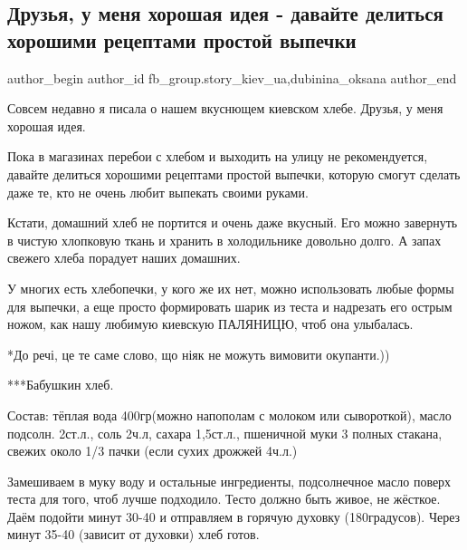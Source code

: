  
 
 
 
 
 
\subsection{Друзья, у меня хорошая идея - давайте делиться хорошими рецептами простой выпечки}
\label{sec:28_02_2022.fb.fb_group.story_kiev_ua.2.vypechka}
 
\ifcmt
 author_begin
   author_id fb_group.story_kiev_ua,dubinina_oksana
 author_end
\fi

Совсем недавно я писала о нашем вкуснющем киевском хлебе. Друзья, у меня
хорошая идея. 

Пока в магазинах перебои с хлебом и выходить на улицу не рекомендуется, давайте
делиться хорошими рецептами простой выпечки, которую смогут сделать даже те,
кто не очень любит выпекать своими руками. 

Кстати, домашний хлеб не портится и очень даже вкусный. Его можно завернуть в
чистую хлопковую ткань и хранить в холодильнике довольно долго. А запах свежего
хлеба порадует наших домашних. 


У многих есть хлебопечки, у кого же их нет, можно использовать любые формы для
выпечки, а еще просто формировать шарик из теста и надрезать его острым ножом,
как нашу любимую киевскую ПАЛЯНИЦЮ, чтоб она улыбалась.

*До речі, це те саме слово, що ніяк не можуть вимовити окупанти.))

***Бабушкин хлеб.

Состав: тёплая вода 400гр(можно напополам с молоком или сывороткой), масло
подсолн. 2ст.л., соль 2ч.л, сахара 1,5ст.л., пшеничной муки 3 полных стакана,
свежих около 1/3 пачки (если сухих дрожжей 4ч.л.)

Замешиваем в муку воду и остальные ингредиенты, подсолнечное масло поверх теста
для того, чтоб лучше подходило. Тесто должно быть живое, не жёсткое. Даём
подойти минут 30-40 и отправляем в горячую духовку (180градусов). Через минут
35-40 (зависит от духовки)  хлеб готов.

